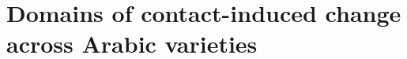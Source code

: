 \documentclass[output=book,modfonts,nonflat,collection,collectionchapter
		,colorlinks,citecolor=brown,
		arabicfont
		  ]{langsci/langscibook}
\begin{document}
\part{Domains of contact-induced change across Arabic varieties}
 



 
 
\end{document}
